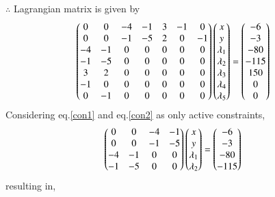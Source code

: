\documentclass[journal,12pt,twocolumn]{IEEEtran}
\begin{document}
$\therefore$ Lagrangian matrix is given by
\begin{align}
    \begin{pmatrix}0 & 0 & -4 & -1 & 3 & -1 & 0 \\ 0 & 0 & -1 & -5 & 2 & 0 & -1 \\ -4 & -1 & 0 & 0 & 0 & 0 & 0 \\ -1 & -5 & 0 & 0 & 0 & 0 & 0 \\ 3 & 2 & 0 & 0 & 0 & 0 & 0 \\ -1 & 0 & 0 & 0 & 0 & 0 & 0 \\ 0 & -1 & 0 & 0 & 0 & 0 & 0 \end{pmatrix}\begin{pmatrix}x \\ y \\ \lambda_1 \\ \lambda_2 \\ \lambda_3 \\ \lambda_4 \\ \lambda_5 \end{pmatrix} &= \begin{pmatrix}-6 \\ -3 \\ -80 \\ -115 \\ 150 \\ 0 \\0 \end{pmatrix}
\end{align}
Considering eq.\eqref{con1} and eq.\eqref{con2} as only active constraints,
\begin{align}
    \begin{pmatrix}0 & 0 & -4 & -1 \\ 0 & 0 & -1 & -5 \\ -4 & -1 & 0 & 0 \\ -1 & -5 & 0 & 0\end{pmatrix}\begin{pmatrix}x \\ y \\ \lambda_1 \\ \lambda_2\end{pmatrix} &= \begin{pmatrix}-6 \\ -3 \\ -80 \\ -115\end{pmatrix}
\end{align}
resulting in,
\end{document}
